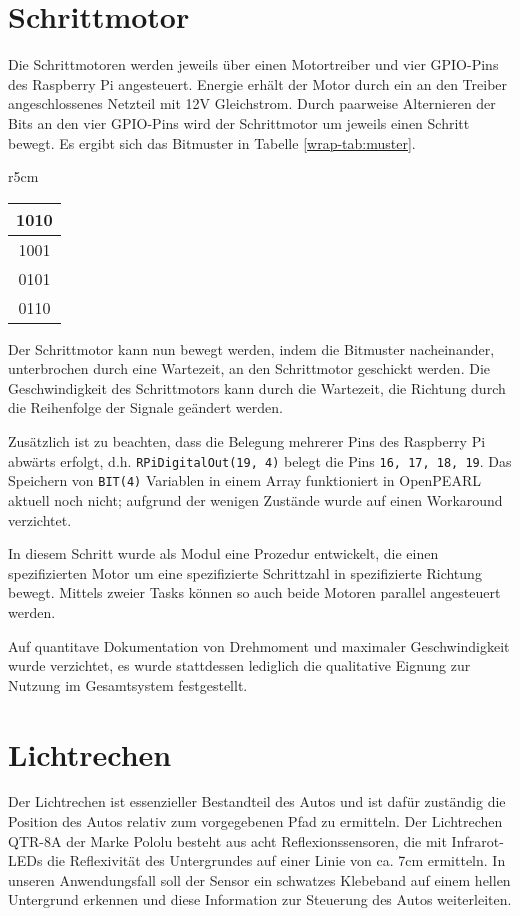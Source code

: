 \section{Schrittmotor}
Die Schrittmotoren werden jeweils über einen Motortreiber und vier GPIO-Pins des Raspberry Pi angesteuert. Energie erhält der Motor durch ein an den Treiber angeschlossenes Netzteil mit 12V Gleichstrom. Durch paarweise Alternieren der Bits an den vier GPIO-Pins wird der Schrittmotor um jeweils einen Schritt bewegt. Es ergibt sich das Bitmuster in Tabelle \ref{wrap-tab:muster}.
\begin{wraptable}{r}{5cm}
	\begin{center}
		\begin{tabular}{|c|}
			\hline
			1010\\
			\hline
			1001\\
			\hline
			0101\\
			\hline
			0110\\
			\hline
		\end{tabular}
	\end{center}
	\caption{Bitmuster}\label{wrap-tab:muster}
\end{wraptable}

Der Schrittmotor kann nun bewegt werden, indem die Bitmuster nacheinander, unterbrochen durch eine Wartezeit, an den Schrittmotor geschickt werden. 
Die Geschwindigkeit des Schrittmotors kann durch die Wartezeit, die Richtung durch die Reihenfolge der Signale geändert werden.

Zusätzlich ist zu beachten, dass die Belegung mehrerer Pins des Raspberry Pi abwärts erfolgt, d.h. \texttt{RPiDigitalOut(19, 4)} belegt die Pins \texttt{16, 17, 18, 19}. 
Das Speichern von \texttt{BIT(4)} Variablen in einem Array funktioniert in OpenPEARL aktuell noch nicht; aufgrund der wenigen Zustände wurde auf einen Workaround verzichtet.

In diesem Schritt wurde als Modul eine Prozedur entwickelt, die einen spezifizierten Motor um eine spezifizierte Schrittzahl in spezifizierte Richtung bewegt. Mittels zweier Tasks können so auch beide Motoren parallel angesteuert werden.

Auf quantitave Dokumentation von Drehmoment und maximaler Geschwindigkeit wurde verzichtet, es wurde stattdessen lediglich die qualitative Eignung zur Nutzung im Gesamtsystem festgestellt.


\section{Lichtrechen}
Der Lichtrechen ist essenzieller Bestandteil des Autos und ist dafür zuständig die Position des Autos relativ zum vorgegebenen Pfad zu ermitteln. Der Lichtrechen QTR-8A der Marke Pololu besteht aus acht Reflexionssensoren, die mit Infrarot-LEDs die Reflexivität des Untergrundes auf einer Linie von ca. 7cm ermitteln. In unseren Anwendungsfall soll der Sensor ein schwatzes Klebeband auf einem hellen Untergrund erkennen und diese Information zur Steuerung des Autos weiterleiten. 

